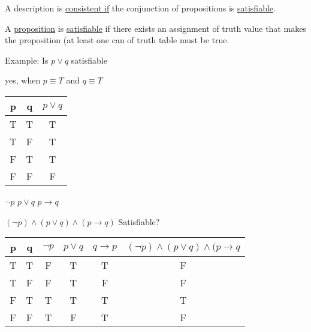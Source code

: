 \documentclass{article}
\begin{document}
\hfill \break
A description is \underline{consistent if} the conjunction of propositions is \underline{satisfiable}.

\hfill \break
A \underline{proposition} is \underline{satisfiable} if there exists an assignment of truth value that makes the proposition (at least one can of truth table must be true.

\hfill \break
Example: Is $p\lor q$ satisfiable

yes, when $p\equiv T$ and $q\equiv T$
\begin{center}
\begin{tabular}{ |c|c|c| } 
 \hline
 p & q & $p\lor q$ \\ 
 \hline
 T & T & T \\ 
 T & F & T \\
 F & T & T \\
 F & F & F \\
 \hline
\end{tabular}
\end{center}

$\lnot p$  \hspace{5mm}  $p\lor q$ \hspace{5mm} $p\rightarrow q$

\hfill \break
\underline{$(\lnot p)\land(p\lor q)\land(p\rightarrow q)$} Satisfiable?
\begin{center}
\begin{tabular}{ |c|c|c|c|c|c| } 
 \hline
 p & q & $\lnot p$ & $p\lor q$ & $q\rightarrow p$ & $(\lnot p)\land(p \lor q)\land(p\rightarrow q$ \\ 
 \hline
 T & T & F & T & T & F \\ 
 T & F & F & T & F & F \\
 F & T & T & T & T & T \\
 F & F & T & F & T & F \\
 \hline
\end{tabular}
\end{center}
\end{document}

